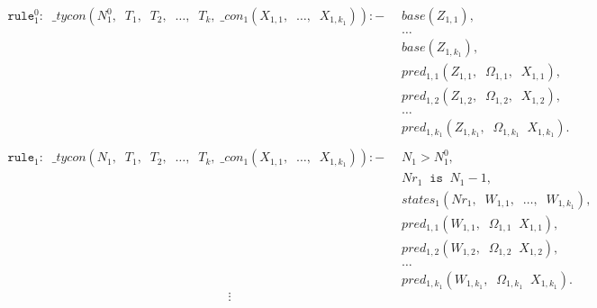 \documentclass{report}
\theoremstyle{definition}
\theoremstyle{definition}
\newcommand{\ttt}[1]{\texttt{#1}}
\newcommand{\tav}{\;\;}
\begin{document}
	\begin{align*}
		\ttt{rule}_{1}^{0}: \tav \_ tycon (N_{1}^{0}, \tav T_1, \tav T_2, \tav \ldots, \tav T_k, \; \_ con_1(X_{1,1}, \tav \ldots, \tav X_{1,k_1})) :-
		  & \tav base(Z_{1,1}),                                                 &   &   \\
		  & \tav \ldots                                                         &   &   \\
		  & \tav base(Z_{1,k_1}),                                               &   &   \\
		  & \tav pred_{1, 1}(Z_{1,1}, \tav \Omega_{1,1}, \tav X_{1,1}),         &   &   \\
		  & \tav pred_{1, 2}(Z_{1,2}, \tav \Omega_{1,2}, \tav X_{1,2}),         &   &   \\
		  & \tav \ldots \tav                                                    &   &   \\
		  & \tav pred_{1, k_1}(Z_{1,k_1}, \tav \Omega_{1,k_1} \tav X_{1,k_1}).  &   &   \\
		\\
		\ttt{rule}_1: \tav \_ tycon (N_1, \tav T_1, \tav T_2, \tav \ldots, \tav T_k, \; \_ con_1(X_{1,1}, \tav \ldots, \tav X_{1,k_1})) :-
		  & \tav N_1 > N_{1}^{0},                                               &   &   \\
		  & \tav Nr_1 \tav \ttt{is} \tav N_1 - 1,                               &   &   \\
		  & \tav states_1(Nr_1, \tav W_{1,1}, \tav \ldots, \tav W_{1,k_1}),     &   &   \\
		  & \tav pred_{1, 1}(W_{1,1}, \tav \Omega_{1, 1} \tav X_{1,1}),         &   &   \\
		  & \tav pred_{1, 2}(W_{1,2}, \tav \Omega_{1, 2} \tav X_{1,2}),         &   &   \\
		  & \tav \ldots \tav                                                    &   &   \\
		  & \tav pred_{1, k_1}(W_{1,k_1}, \tav \Omega_{1, k_1} \tav X_{1,k_1}). &   &   
	\end{align*}
	$$\vdots$$
\end{document}
